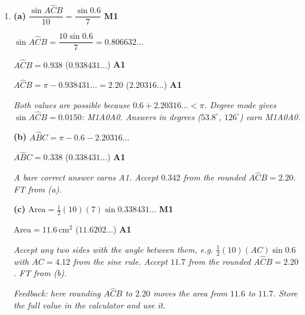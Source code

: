 \documentclass[12pt, twoside]{article}
\begin{document}
\begin{enumerate}[itemsep=0.3cm]
\emph{Accept $5.07 \times 10^{3}$. Accept any two sides with the angle
between them, e.g. $\frac{1}{2}(120)(140)\sin B\hat{A}C$ with
$B\hat{A}C = 37.2^\circ$. FT from (a).}

\textbf{(c)} $\frac{1}{2}(140)h = 5074.81\ldots$ \hfill \textbf{M1}

$h = 72.5\,\text{m}$ \quad ($72.4973\ldots$) \hfill \textbf{A1}

\emph{M1 for recognizing that the shortest route is perpendicular to $AC$,
by any method: the area with base $AC$, or $h = 120\sin B\hat{A}C$, or
$h = 85\sin B\hat{C}A$. Accept $72.4$ from the rounded area $5070$. FT from
(b).}

\emph{Feedback: carry the full area into (c); round only the final
answer.}

\newpage

\item[4.] [Maximum mark: 6]

\textbf{(a)} $\dfrac{\sin A\hat{C}B}{10} = \dfrac{\sin 0.6}{7}$ \hfill \textbf{M1}

$\sin A\hat{C}B = \dfrac{10\sin 0.6}{7} = 0.806632\ldots$

$A\hat{C}B = 0.938$ \quad ($0.938431\ldots$) \hfill \textbf{A1}

$A\hat{C}B = \pi - 0.938431\ldots = 2.20$ \quad ($2.20316\ldots$) \hfill \textbf{A1}

\emph{Both values are possible because $0.6 + 2.20316\ldots < \pi$. Degree
mode gives $\sin A\hat{C}B = 0.0150$: M1A0A0. Answers in degrees
($53.8^\circ$, $126^\circ$) earn M1A0A0.}

\textbf{(b)} $A\hat{B}C = \pi - 0.6 - 2.20316\ldots$

$A\hat{B}C = 0.338$ \quad ($0.338431\ldots$) \hfill \textbf{A1}

\emph{A bare correct answer earns A1. Accept $0.342$ from the rounded
$A\hat{C}B = 2.20$. FT from (a).}

\textbf{(c)} $\text{Area} = \frac{1}{2}(10)(7)\sin 0.338431\ldots$ \hfill \textbf{M1}

$\text{Area} = 11.6\,\text{cm}^{2}$ \quad ($11.6202\ldots$) \hfill \textbf{A1}

\emph{Accept any two sides with the angle between them, e.g.
$\frac{1}{2}(10)(AC)\sin 0.6$ with $AC = 4.12$ from the sine rule. Accept
$11.7$ from the rounded $A\hat{C}B = 2.20$. FT from (b).}

\emph{Feedback: here rounding $A\hat{C}B$ to $2.20$ moves the area from
$11.6$ to $11.7$. Store the full value in the calculator and use it.}


\end{enumerate}
\end{document}
